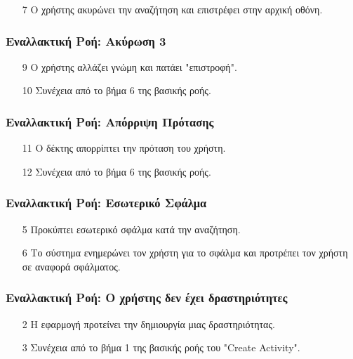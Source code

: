 \begin{enumerate}
    \item[7] Ο χρήστης ακυρώνει την αναζήτηση και επιστρέφει στην αρχική οθόνη.
\end{enumerate}

\subsubsection{Εναλλακτική Ροή: Ακύρωση 3}

\begin{enumerate}
    \item[9] Ο χρήστης αλλάζει γνώμη και πατάει "επιστροφή".
    \item[10] Συνέχεια από το βήμα 6 της βασικής ροής.
\end{enumerate}

\subsubsection{Εναλλακτική Ροή: Απόρριψη Πρότασης}

\begin{enumerate}
    \item[11] Ο δέκτης απορρίπτει την πρόταση του χρήστη.
    \item[12] Συνέχεια από το βήμα 6 της βασικής ροής.
\end{enumerate}

\subsubsection{Εναλλακτική Ροή: Εσωτερικό Σφάλμα}

\begin{enumerate}
    \item[5] Προκύπτει εσωτερικό σφάλμα κατά την αναζήτηση.
    \item[6] Το σύστημα ενημερώνει τον χρήστη για το σφάλμα και προτρέπει τον
        χρήστη σε αναφορά σφάλματος.
\end{enumerate}

\subsubsection{Εναλλακτική Ροή: Ο χρήστης δεν έχει δραστηριότητες}

\begin{enumerate}
    \item[2] Η εφαρμογή προτείνει την δημιουργία μιας δραστηριότητας.
    \item[3] Συνέχεια από το βήμα 1 της βασικής ροής του "Create Activity".
\end{enumerate}

